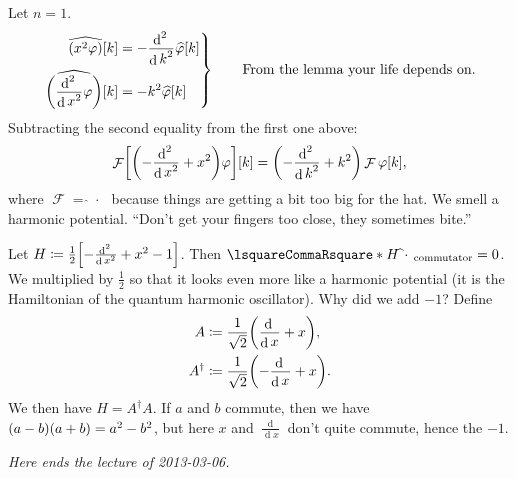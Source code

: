 \documentclass[10pt]{article}
\DeclarePairedDelimiter\parentheses{\lparen}{\rparen}
\DeclarePairedDelimiter\squareBrackets{[}{]}
\DeclareMathOperator{\diffd}{d}
\DeclareMathOperator{\FT}{\mathcal{F}}
\newcommand\ft\widehat
\newcommand{\adj}{^\dagger}
\newcommand\deriv[3][]{\frac{\diffd^{#1} {#3}}{{\diffd {#2}}^{#1}}}
\newcommand{\derivop}[2][]{\deriv[#1]{#2}{}}
\newcommand\of[1]{\parentheses*{#1}}
\newcommand\pa[1]{\parentheses*{#1}}
\newcommand\commutator[2]{\lsquareCommaRsquare*{#1}{#2}}
\newcommand\gj\varphi
\newcommand\placeholder{\,\:\cdot\:\,}
\renewcommand\of[1]{\squareBrackets*{#1}}
\renewcommand\commutator[2]{\lsquareCommaRsquare*{#1}{#2}_{\mathrm{commutator}}}
\begin{document}
  Let $n=1$.
  \begin{equation*}
    \left.
    \begin{aligned}
      \ft{\pa{x^2\gj}}\of k &= -\derivop[2]{k}\ft\gj\of k \\
      \ft{\pa{\derivop[2]{x}\gj}}\of k &= -k^2 \ft\gj\of k
    \end{aligned}
    \right\rbrace \qquad \text{From the lemma your life depends on.}
  \end{equation*}
  Subtracting the second equality from the first one above:
  \begin{equation*}
    \FT\of{\pa{-\derivop[2]{x}+x^2}\gj}\of k = \pa{-\derivop[2]{k}+k^2}\FT\gj\of k,
  \end{equation*}
  where $\FT = \ft\placeholder$ because things are getting a bit too big for the hat.
  We smell a harmonic potential. ``Don't get your fingers too close, they sometimes bite.''
  
  Let $H \coloneqq \frac{1}{2}\of{-\derivop[2]{x}+x^2-1}$. Then $\commutator H {\ft\placeholder}=0$. We multiplied by $\frac{1}{2}$ so that it looks even more like a harmonic potential (it is the Hamiltonian of the quantum harmonic oscillator). Why did we add $-1$? Define
  \begin{align*}
    A &\coloneqq \frac{1}{\sqrt 2}\pa{\derivop{x} + x},\\
    A\adj &\coloneqq \frac{1}{\sqrt 2}\pa{-\derivop{x} + x}.
  \end{align*}
  We then have $H = A\adj A$. If $a$ and $b$ commute, then we have $\pa{a-b}\pa{a+b}  = a^2-b^2$, but here $x$ and $\derivop{x}$ don't quite commute, hence the $-1$.

\emph{Here ends the lecture of 2013-03-06.}
\end{document}

